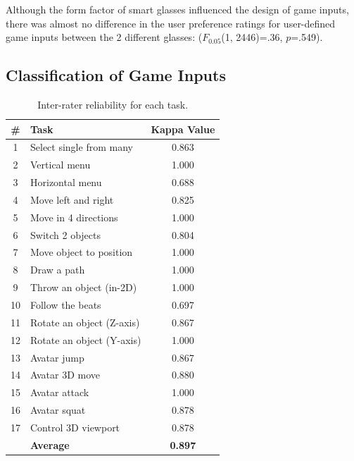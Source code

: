 \documentclass{sigchi}
\newcommand\tabhead[1]{\small\textbf{#1}}
\begin{document}
  Although the form factor of smart glasses influenced the design of game inputs, there was almost no difference in the user preference ratings for user-defined game inputs between the 2 different glasses: ($F_{0.05}$(1, 2446)=.36, $p$=.549).


  \subsection{Classification of Game Inputs}

   \begin{table}
    \centering
    \begin{tabular}{|c|l|c|}
      \hline
      \tabhead{\#} &
      \multicolumn{1}{|p{0.4\columnwidth}|}{\centering\tabhead{Task}} &
      \multicolumn{1}{|p{0.2\columnwidth}|}{\centering\tabhead{Kappa Value}} \\
      \hline
      1 & Select single from many& 0.863\\
      \hline
      2 & Vertical menu & 1.000\\
      \hline
      3 & Horizontal menu & 0.688\\
      \hline
      4 & Move left and right & 0.825\\
      \hline
      5 & Move in 4 directions & 1.000\\
      \hline
      6 & Switch 2 objects & 0.804\\
      \hline
      7 & Move object to position & 1.000\\
      \hline
      8 & Draw a path & 1.000\\
      \hline
      9 & Throw an object (in-2D) & 1.000\\
      \hline
      10 & Follow the beats & 0.697\\
      \hline
      11 & Rotate an object (Z-axis) & 0.867 \\
      \hline
      12 & Rotate an object (Y-axis) & 1.000\\
      \hline
      13 & Avatar jump & 0.867\\
      \hline
      14 & Avatar 3D move & 0.880\\
      \hline
      15 & Avatar attack & 1.000\\
      \hline
      16 & Avatar squat & 0.878\\
      \hline
      17 & Control 3D viewport  & 0.878\\
      \hline
      & \bf{Average} & \bf{0.897}\\
      \hline

    \end{tabular}
    \caption{Inter-rater reliability for each task.}
    \label{tab:kappa}
  \end{table}
\end{document}
